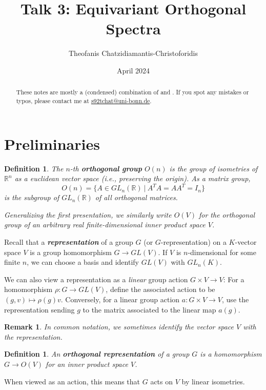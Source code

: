 \documentclass{scrartcl}
\title{Talk 3: Equivariant Orthogonal Spectra}
\author{Theofanis Chatzidiamantis-Christoforidis}
\date{April 2024}
\newcommand{\textbi}[1]{\textbf{\textit{#1}}}
\newcommand{\bR}{\mathbb{R}}
\newtheorem{defin}[subsection]{Definition}
\newtheorem{rem}[subsection]{Remark}
\begin{document}
\renewcommand{\abstractname}{\vspace{-\baselineskip}}

\maketitle
\begin{abstract}
   These notes are mostly a (condensed) combination of \cite[3.1]{GHT} and \cite[1-3]{Sch23}. If you spot any mistakes or typos, please contact me at \href{mailto:s92tchat@uni-bonn.de}{s92tchat@uni-bonn.de}. 
\end{abstract}


\section{Preliminaries}

\begin{defin}
    The $n$-th \textbi{orthogonal group} $O(n)$ is the group of isometries of $\bR^n$ as a euclidean vector space (i.e., preserving the origin). As a matrix group, $$O(n)=\{A\in GL_n(\bR)\ |\ A^TA=AA^T=I_n\}$$ is the subgroup of $GL_n(\bR)$ of all orthogonal matrices. 
    \par Generalizing the first presentation, we similarly write $O(V)$ for the orthogonal group of an arbitrary real finite-dimensional inner product space $V$.
\end{defin}

Recall that a \textbi{representation} of a group $G$ (or $G$-representation) on a $K$-vector space $V$ is a group homomorphism $G\to GL(V)$. If $V$ is $n$-dimensional for some finite $n$, we can choose a basis and identify $GL(V)$ with $GL_n(K)$.
\par We can also view a representation as a \textit{linear} group action $G\times V\to V$: For a homomorphism $\rho:G\to GL(V)$, define the associated action to be $(g, v)\mapsto \rho(g)v$. Conversely, for a linear group action $a:G\times V\to V$, use the representation sending $g$ to the matrix associated to the linear map $a(g)$.

\begin{rem}
    In common notation, we sometimes identify the vector space $V$ with the representation.
\end{rem}

\begin{defin}
    An \textbi{orthogonal representation} of a group $G$ is a homomorphism $G\to O(V)$ for an inner product space $V$. 
\end{defin} 
When viewed as an action, this means that $G$ acts on $V$ by linear isometries.
\end{document}
